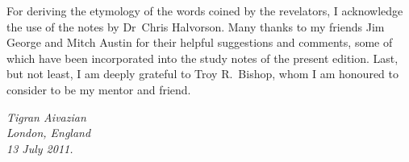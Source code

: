 For deriving the etymology of the words coined by the revelators, I acknowledge the use of the notes by Dr~Chris Halvorson.
Many thanks to my friends Jim George and Mitch Austin for their helpful suggestions and comments,
some of which have been incorporated into the study notes of the present edition.
Last, but not least, I am deeply grateful to Troy R.~Bishop, whom I am honoured to consider to be my mentor and friend.


\begin{flushleft}
\itshape
\hspace*{6pt}Tigran Aivazian\\
\hspace*{6pt}London, England\\
\hspace*{6pt}13 July 2011.\\
\end{flushleft}
